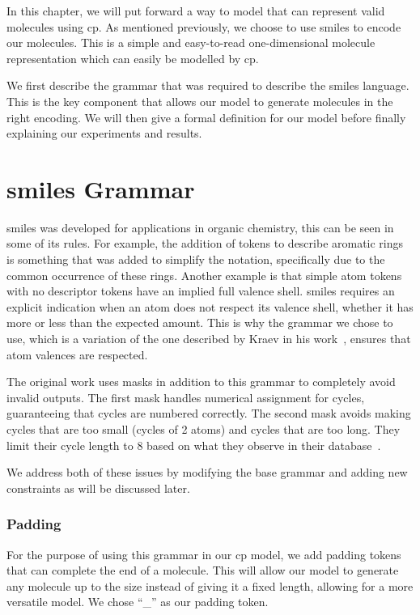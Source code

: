 \documentclass[../Document.tex]{subfiles}
\begin{document}
\label{chap:cp-validity}

In this chapter, we will put forward a way to model that can represent valid molecules using \gls{cp}.
As mentioned previously, we choose to use \gls{smiles} to encode our molecules. This is a simple and easy-to-read one-dimensional molecule representation which can easily be modelled by \gls{cp}.

We first describe the grammar that was required to describe the \gls{smiles} language. This is the key component that allows our model to generate molecules in the right encoding. We will then give a formal definition for our model before finally explaining our experiments and results.


\section{\gls{smiles} Grammar}
\label{sec:smiles-valid-grammar}
\gls{smiles} was developed for applications in organic chemistry, this can be seen in some of its rules. For example, the addition of tokens to describe aromatic rings is something that was added to simplify the notation, specifically due to the common occurrence of these rings. Another example is that simple atom tokens with no descriptor tokens have an implied full valence shell. \gls{smiles} requires an explicit indication when an atom does not respect its valence shell, whether it has more or less than the expected amount. This is why the grammar we chose to use, which is a variation of the one described by Kraev in his work~\cite{kraev2018grammars}, ensures that atom valences are respected.


The original work uses masks in addition to this grammar to completely avoid invalid outputs.
The first mask handles numerical assignment for cycles, guaranteeing that cycles are numbered correctly.
The second mask avoids making cycles that are too small (\ie cycles of 2 atoms) and cycles that are too long. They limit their cycle length to 8 based on what they observe in their database~\cite{kraev2018grammars}.

We address both of these issues by modifying the base grammar and adding new constraints as will be discussed later.

\subsubsection{Padding}
For the purpose of using this grammar in our \gls{cp} model, we add padding tokens that can complete the end of a molecule. 
This will allow our model to generate any molecule up to the size instead of giving it a fixed length, allowing for a more versatile model.
We chose ``\_'' as our padding token.
\end{document}

